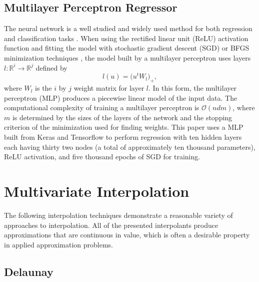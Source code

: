 \documentclass[smallextended,final]{svjour3}       %
\begin{document}
\subsection{Multilayer Perceptron Regressor}
\label{sec:mlp}
The neural network is a well studied and widely used method for both regression and classification tasks \cite{rumelhart1988learning,hornik1989multilayer}. When using the rectified linear unit (ReLU) activation function \cite{dahl2013improving} and fitting the model with stochastic gradient descent (SGD) or BFGS minimization techniques \cite{goh2017why,moller1993scaled,robbins1951stochastic}, the model built by a multilayer perceptron uses layers $l : \mathbb{R}^{i} \rightarrow \mathbb{R}^{j}$ defined by
$$ l(u) = \bigl( u^t W_l \bigr)_+ ,$$
where $W_l$ is the $i$ by $j$ weight matrix for layer $l$. In this form, the multilayer perceptron (MLP) produces a piecewise linear model of the input data. The computational complexity of training a multilayer perceptron is $\mathcal{O}(n d m)$, where $m$ is determined by the sizes of the layers of the network and the stopping criterion of the minimization used for finding weights. This paper uses a MLP built from Keras and Tensorflow to perform regression \cite{chollet2015keras,tensorflow2015-whitepaper} with ten hidden layers each having thirty two nodes (a total of approximately ten thousand parameters), ReLU activation, and five thousand epochs of SGD for training. 

\section{Multivariate Interpolation}
\label{sec:interpolation}
The following interpolation techniques demonstrate a reasonable variety of approaches to interpolation. All of the presented interpolants produce approximations that are continuous in value, which is often a desirable property in applied approximation problems.

\subsection{Delaunay}
\label{sec:delaunay}
\end{document}
